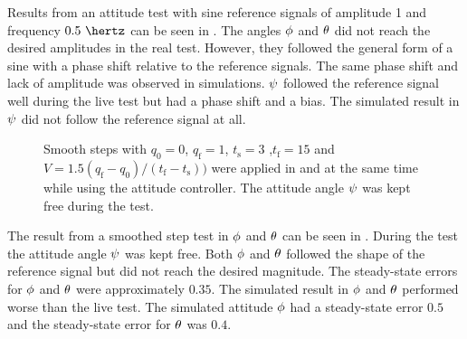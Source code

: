 Results from an attitude test with sine reference signals of amplitude 1 and frequency $0.5\ \hertz$ can be seen in . The angles $\phi$ and $\theta$ did not reach the desired amplitudes in the real test. However, they followed the general form of a sine with a phase shift relative to the reference signals. The same phase shift and lack of amplitude was observed in simulations. $\psi$ followed the reference signal well during the live test but had a phase shift and a bias. The simulated result in $\psi$ did not follow the reference signal at all. 

\begin{figure}
\centering
  \qquad
  \qquad
  \qquad
  \caption{\label{fig:StepPhiThetaAttitude}%
  Smooth steps with $q_{\text{0}} = 0$, $q_{\text{f}} = 1$, $t_{\text{s}} = 3$ ,$t_{\text{f}} = 15$ and $V = 1.5 (q_{\text{f}} - q_{\text{0}})/(t_{\text{f}} - t_{\text{s}}))$ were applied in \pitchAngle and \rollAngle at the same time while using the attitude controller. The attitude angle $\psi$ was kept free during the test.}
\end{figure}

The result from a smoothed step test in $\phi$ and $\theta$ can be seen in . During the test the attitude angle $\psi$ was kept free. Both $\phi$ and $\theta$ followed the shape of the reference signal but did not reach the desired magnitude. The steady-state errors for $\phi$ and $\theta$ were approximately $0.35$. The simulated result in $\phi$ and $\theta$ performed worse than the live test. The simulated attitude $\phi$ had a steady-state error $0.5$ and the steady-state error for $\theta$ was $0.4$.

